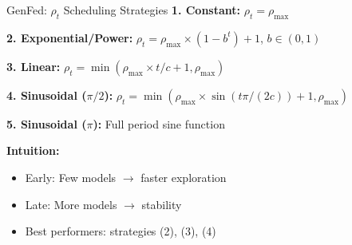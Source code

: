 \documentclass{beamer}
\begin{document}
\begin{frame}{GenFed: $\rho_t$ Scheduling Strategies}
\textbf{1. Constant:} $\rho_t = \rho_{\max}$

\textbf{2. Exponential/Power:} $\rho_t = \rho_{\max} \times (1 - b^t) + 1$, $b \in (0,1)$

\textbf{3. Linear:} $\rho_t = \min(\rho_{\max} \times t/c + 1, \rho_{\max})$

\textbf{4. Sinusoidal ($\pi/2$):} $\rho_t = \min(\rho_{\max} \times \sin(t\pi/(2c)) + 1, \rho_{\max})$

\textbf{5. Sinusoidal ($\pi$):} Full period sine function

\vspace{0.3cm}
\textbf{Intuition:}
\begin{itemize}
\item Early: Few models $\to$ faster exploration  
\item Late: More models $\to$ stability
\item Best performers: strategies (2), (3), (4)
\end{itemize}
\end{frame}
\end{document}
